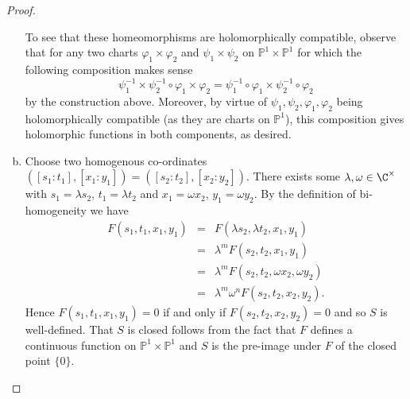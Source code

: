 \documentclass[10pt]{amsart}
\begin{document}
\begin{thm}
\begin{proof}
\begin{enumerate}[(a)]
      To see that these homeomorphisms are holomorphically compatible, observe that for any two charts $\varphi_1 \times \varphi_2$ and $\psi_1 \times \psi_2$ on $\mathbb{P}^1 \times \mathbb{P}^1$ for which the following composition makes sense
      $$\psi_1^{-1} \times \psi_2^{-1} \circ \varphi_1 \times \varphi_2 = \psi_1^{-1} \circ \varphi_1 \times \psi_2^{-1} \circ \varphi_2$$
      by the construction above.
      Moreover, by virtue of $\psi_1, \psi_2, \varphi_1, \varphi_2$ being holomorphically compatible (as they are charts on $\mathbb{P}^1$), this composition gives holomorphic functions in both components, as desired.
    \item
      Choose two homogenous co-ordinates $([s_1 : t_1], [x_1 : y_1]) = ([s_2 : t_2], [x_2 : y_2])$.
      There exists some $\lambda, \omega \in \C^\times$ with $s_1 = \lambda s_2$, $t_1 = \lambda t_2$ and $x_1 = \omega x_2$, $y_1 = \omega y_2$.
      By the definition of bi-homogeneity we have
      \begin{eqnarray*}
        F(s_1, t_1, x_1, y_1) &=& F(\lambda s_2, \lambda t_2, x_1, y_1)\\
        &=& \lambda^m F(s_2, t_2, x_1, y_1)\\
        &=& \lambda^m F(s_2, t_2, \omega x_2, \omega y_2)\\
        &=& \lambda^m \omega^n F(s_2, t_2, x_2, y_2).
      \end{eqnarray*}
      Hence $F(s_1, t_1, x_1, y_1) = 0$ if and only if $F(s_2, t_2, x_2, y_2) = 0$ and so $S$ is well-defined.
      That $S$ is closed follows from the fact that $F$ defines a continuous function on $\mathbb{P}^1 \times \mathbb{P}^1$ and $S$ is the pre-image under $F$ of the closed point $\{0\}$.
    \end{enumerate}
  \end{proof}
\end{thm}
\end{document}
